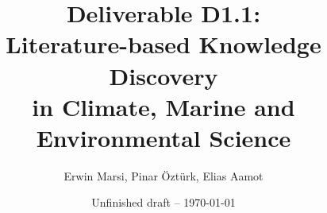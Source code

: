 \documentclass[11pt,oneside,a4paper]{report}
\begin{document}
\title{Deliverable D1.1:\\ Literature-based Knowledge Discovery\\in Climate, Marine and Environmental Science}
\author{Erwin Marsi, Pinar \"Ozt\"urk, Elias Aamot}
\date{Unfinished draft -- \today}
\maketitle

\abstract{}

\tableofcontents













\end{document}
